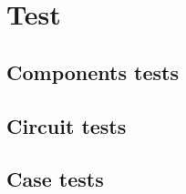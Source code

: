 \chapter{Test}
\label{sec:test}

\section{Components tests}
\label{sec:cote}


\section{Circuit tests}
\label{sec:cite}

\section{Case tests}
\label{sec:cate}
